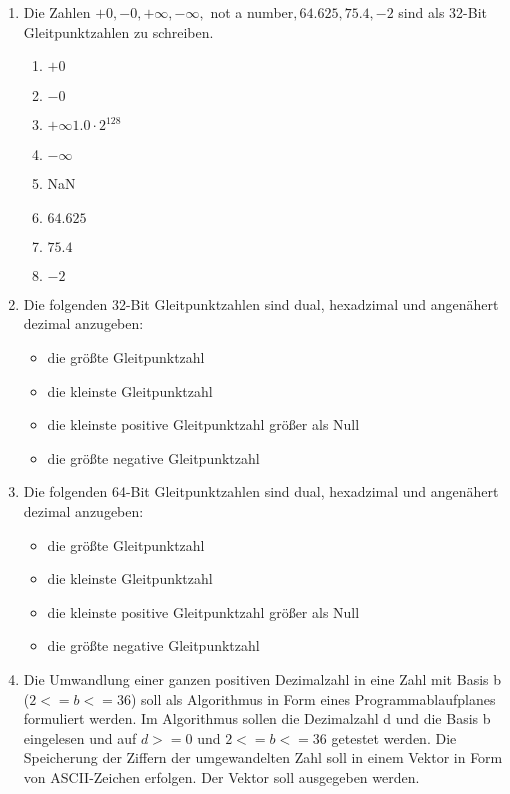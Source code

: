 \documentclass[12pt,a4paper]{scrreprt}
\begin{document}
\begin{enumerate}

\item %
Die Zahlen $+0 , -0 , +\infty , -\infty,$ not a number$, 64.625, 75.4, -2$ sind als 32-Bit Gleitpunktzahlen zu schreiben.

\begin{enumerate}
    \item $+0$
    \item $-0$
    \item $+\infty 1.0·2^128$
    \item $-\infty $
	\item NaN
    \item $64.625$
    \item $75.4$
    \item $-2$
\end{enumerate}

\item %
Die folgenden 32-Bit Gleitpunktzahlen sind dual, hexadzimal und angenähert dezimal anzugeben:

\begin{itemize}
\item die größte Gleitpunktzahl
\item die kleinste Gleitpunktzahl
\item die kleinste positive Gleitpunktzahl größer als Null
\item die größte negative Gleitpunktzahl
\end{itemize}

\item %
Die folgenden 64-Bit Gleitpunktzahlen sind dual, hexadzimal und angenähert dezimal anzugeben:

\begin{itemize}
\item die größte Gleitpunktzahl
\item die kleinste Gleitpunktzahl
\item die kleinste positive Gleitpunktzahl größer als Null
\item die größte negative Gleitpunktzahl
\end{itemize}

\item\label{umwandlungsalgo} %
Die Umwandlung einer ganzen positiven Dezimalzahl in eine Zahl mit Basis b ($2 < = b <= 36$) soll als Algorithmus in Form eines Programmablaufplanes formuliert werden. Im Algorithmus sollen die Dezimalzahl d und die Basis b eingelesen und auf $d>=0$ und $2<=b<=36$ getestet werden. Die Speicherung der Ziffern der umgewandelten Zahl soll in einem Vektor in Form von ASCII-Zeichen erfolgen. Der Vektor soll ausgegeben werden.


\end{enumerate}
\end{document}
